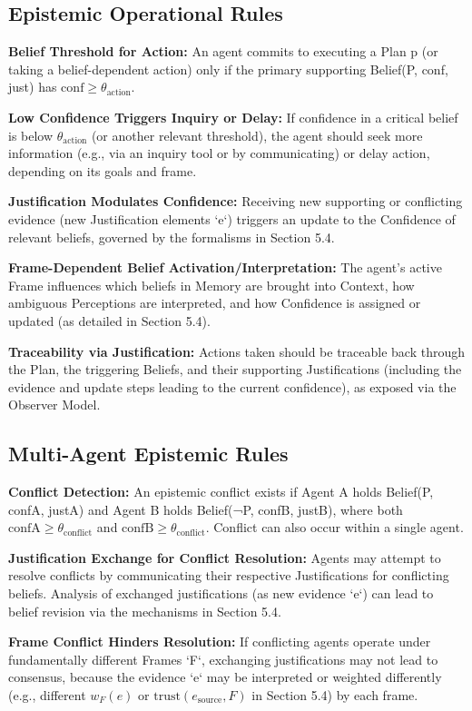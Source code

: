 \documentclass[10pt,a4paper]{article}
\begin{document}
\subsection{Epistemic Operational Rules}
\textbf{Belief Threshold for Action:} An agent commits to executing a Plan p (or taking a belief-dependent action) only if the primary supporting Belief(P, conf, just) has $\mathrm{conf} \geq \theta_{\mathrm{action}}$.

\textbf{Low Confidence Triggers Inquiry or Delay:} If confidence in a critical belief is below $\theta_{\mathrm{action}}$ (or another relevant threshold), the agent should seek more information (e.g., via an inquiry tool or by communicating) or delay action, depending on its goals and frame.

\textbf{Justification Modulates Confidence:} Receiving new supporting or conflicting evidence (new Justification elements `e`) triggers an update to the Confidence of relevant beliefs, governed by the formalisms in Section 5.4.

\textbf{Frame-Dependent Belief Activation/Interpretation:} The agent's active Frame influences which beliefs in Memory are brought into Context, how ambiguous Perceptions are interpreted, and how Confidence is assigned or updated (as detailed in Section 5.4).

\textbf{Traceability via Justification:} Actions taken should be traceable back through the Plan, the triggering Beliefs, and their supporting Justifications (including the evidence and update steps leading to the current confidence), as exposed via the Observer Model.

\subsection{Multi-Agent Epistemic Rules}
\textbf{Conflict Detection:} An epistemic conflict exists if Agent A holds Belief(P, confA, justA) and Agent B holds Belief(¬P, confB, justB), where both $\mathrm{confA} \geq \theta_{\mathrm{conflict}}$ and $\mathrm{confB} \geq \theta_{\mathrm{conflict}}$. Conflict can also occur within a single agent.

\textbf{Justification Exchange for Conflict Resolution:} Agents may attempt to resolve conflicts by communicating their respective Justifications for conflicting beliefs. Analysis of exchanged justifications (as new evidence `e`) can lead to belief revision via the mechanisms in Section 5.4.

\textbf{Frame Conflict Hinders Resolution:} If conflicting agents operate under fundamentally different Frames `F`, exchanging justifications may not lead to consensus, because the evidence `e` may be interpreted or weighted differently (e.g., different $w_F(e)$ or $\text{trust}(e_{\text{source}}, F)$ in Section 5.4) by each frame.
\end{document}
